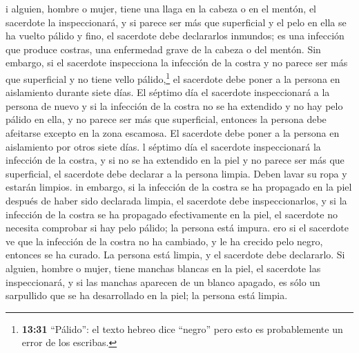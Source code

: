  i alguien, hombre o mujer, tiene una llaga en la cabeza o
en el mentón,  el sacerdote la inspeccionará, y si parece
ser más que superficial y el pelo en ella se ha vuelto pálido y fino, el
sacerdote debe declararlos inmundos; es una infección que produce
costras, una enfermedad grave de la cabeza o del mentón. 
Sin embargo, si el sacerdote inspecciona la infección de la costra y no
parece ser más que superficial y no tiene vello pálido,\footnote{\textbf{13:31}
  ``Pálido'': el texto hebreo dice ``negro'' pero esto es probablemente
  un error de los escribas.} el sacerdote debe poner a la persona en
aislamiento durante siete días.  El séptimo día el
sacerdote inspeccionará a la persona de nuevo y si la infección de la
costra no se ha extendido y no hay pelo pálido en ella, y no parece ser
más que superficial,  entonces la persona debe afeitarse
excepto en la zona escamosa. El sacerdote debe poner a la persona en
aislamiento por otros siete días.  l séptimo día el
sacerdote inspeccionará la infección de la costra, y si no se ha
extendido en la piel y no parece ser más que superficial, el sacerdote
debe declarar a la persona limpia. Deben lavar su ropa y estarán
limpios.  in embargo, si la infección de la costra se ha
propagado en la piel después de haber sido declarada limpia,
 el sacerdote debe inspeccionarlos, y si la infección de la
costra se ha propagado efectivamente en la piel, el sacerdote no
necesita comprobar si hay pelo pálido; la persona está impura.
 ero si el sacerdote ve que la infección de la costra no ha
cambiado, y le ha crecido pelo negro, entonces se ha curado. La persona
está limpia, y el sacerdote debe declararlo.  Si alguien,
hombre o mujer, tiene manchas blancas en la piel,  el
sacerdote las inspeccionará, y si las manchas aparecen de un blanco
apagado, es sólo un sarpullido que se ha desarrollado en la piel; la
persona está limpia.


